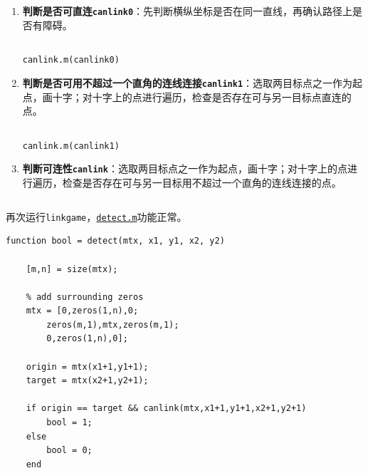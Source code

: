 \documentclass{article}
\numberwithin{figure}{section}
\numberwithin{table}{section}
\numberwithin{listing}{section}
\numberwithin{equation}{section}
\begin{document}
\begin{enumerate}
\begin{enumerate}
                    \item \textbf{判断是否可直连\texttt{canlink0}}：先判断横纵坐标是否在同一直线，再确认路径上是否有障碍。

                        \begin{listing}[H]
                            \inputminted[firstline=51, lastline=62]{matlab}{../linkgame/canlink.m}
                            \caption{\texttt{canlink.m(canlink0)}}
                        \end{listing}

                    \item \textbf{判断是否可用不超过一个直角的连线连接\texttt{canlink1}}：选取两目标点之一作为起点，画十字；对十字上的点进行遍历，检查是否存在可与另一目标点直连的点。

                        \begin{listing}[H]
                            \inputminted[firstline=65, lastline=86]{matlab}{../linkgame/canlink.m}
                            \caption{\texttt{canlink.m(canlink1)}}
                        \end{listing}

                    \item \textbf{判断可连性\texttt{canlink}}：选取两目标点之一作为起点，画十字；对十字上的点进行遍历，检查是否存在可与另一目标用不超过一个直角的连线连接的点。

                        \inputminted[firstline=1, lastline=26]{matlab}{../linkgame/canlink.m}
                        \begingroup
                        \endgroup
                \end{enumerate}

                再次运行\texttt{linkgame}，\href{../linkgame/detect.m}{\texttt{detect.m}}功能正常。

                \begin{verbatim}
function bool = detect(mtx, x1, y1, x2, y2)
    
    [m,n] = size(mtx);
    
    % add surrounding zeros
    mtx = [0,zeros(1,n),0;
        zeros(m,1),mtx,zeros(m,1);
        0,zeros(1,n),0];
    
    origin = mtx(x1+1,y1+1);
    target = mtx(x2+1,y2+1);
    
    if origin == target && canlink(mtx,x1+1,y1+1,x2+1,y2+1)
        bool = 1;
    else
        bool = 0;
    end
       

\end{verbatim}
\end{enumerate}
\end{document}
